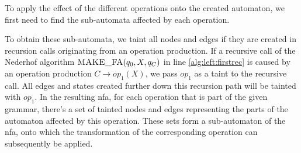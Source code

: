 To apply the effect of the different operations onto the created automaton, we first need to find the sub-automata affected by each operation.

To obtain these sub-automata, we taint all nodes and edges if they are created in recursion calls originating from an operation production. 
If a recursive call of the Nederhof algorithm $\textproc{MAKE\_FA}(q_0, X, q_C)$ in line \ref{alg:left:firstrec} is caused by an operation production $C \rightarrow op_1(X)$, we pass $op_1$ as a taint to the recursive call. All edges and states created further down this recursion path will be tainted with $op_1$. In the resulting \ac{nfa}, for each operation that is part of the given grammar, there's a set of tainted nodes and edges representing the parts of the automaton affected by this operation. These sets form a sub-automaton of the \ac{nfa}, onto which the transformation of the corresponding operation can subsequently be applied.

